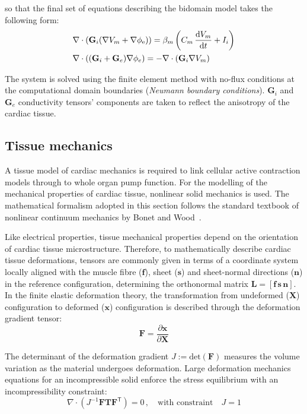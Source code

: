\noindent
so that the final set of equations describing the bidomain model takes the following form:
%
\begin{align}\label{eq:bidomainmodel}
    & \nabla\cdot(\mathbf{G}_i(\nabla V_m + \nabla \phi_{\text{e}})) = \beta_m\left(C_m\,\dfrac{\mathrm{d}{V_m}}{\mathrm{d}{t}} + I_i\right) \\
    & \nabla\cdot((\mathbf{G}_i + \mathbf{G}_e)\nabla \phi_e) = -\nabla\cdot(\mathbf{G}_i\nabla V_m)
\end{align}

\noindent
The system is solved using the finite element method with no-flux conditions at the computational domain boundaries (\textit{Neumann boundary conditions}). $\mathbf{G}_i$ and $\mathbf{G}_e$ conductivity tensors' components are taken to reflect the anisotropy of the cardiac tissue.


%
%
%
\subsection{Tissue mechanics}\label{sec:tissue_mech_math_modelling}
A tissue model of cardiac mechanics is required to link cellular active contraction models through to whole organ pump function. For the modelling of the mechanical properties of cardiac tissue, nonlinear solid mechanics is used. The mathematical formalism adopted in this section follows the standard textbook of nonlinear continuum mechanics by Bonet and Wood~\cite{Bonet:2008}.

\vspace{0.2cm}
Like electrical properties, tissue mechanical properties depend on the orientation of cardiac tissue microstructure. Therefore, to mathematically describe cardiac tissue deformations, tensors are commonly given in terms of a coordinate system locally aligned with the muscle fibre ($\mathbf{f}$), sheet ($\mathbf{s}$) and sheet-normal directions ($\mathbf{n}$) in the reference configuration, determining the orthonormal matrix $\mathbf{L} = [\mathbf{f}\,\mathbf{s}\,\mathbf{n}]$. In the finite elastic deformation theory, the transformation from undeformed ($\mathbf{X}$) configuration to deformed ($\mathbf{x}$) configuration is described through the deformation gradient tensor:
%
\begin{equation}
    \mathbf{F} = \frac{\partial \mathbf{x}}{\partial\mathbf{X}}
\end{equation}

\noindent
The determinant of the deformation gradient $J:=\text{det}(\mathbf{F})$ measures the volume variation as the material undergoes deformation. Large deformation mechanics equations for an incompressible solid enforce the stress equilibrium with an incompressibility constraint:
%
\begin{equation}
    \nabla\cdot(J^{-1}\mathbf{F}\mathbf{T}\mathbf{F}^\mathsf{T}) = 0\,,\quad\text{with constraint}\quad J = 1
\end{equation}

